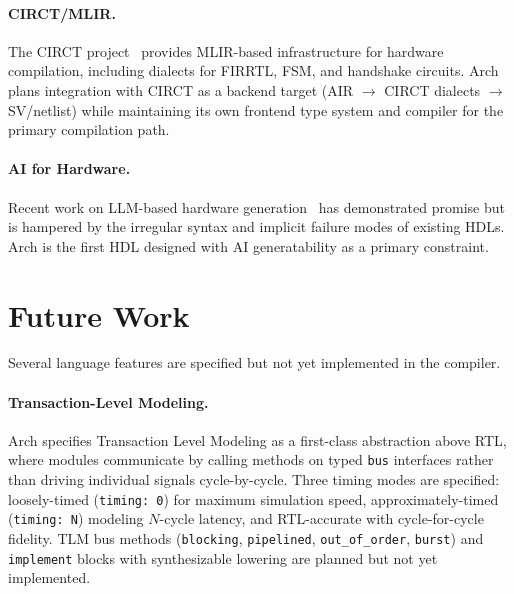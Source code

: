\documentclass[11pt,twocolumn]{article}
\begin{document}
\paragraph{CIRCT/MLIR.}
The CIRCT project~\cite{circt} provides MLIR-based infrastructure for hardware compilation, including dialects for FIRRTL, FSM, and handshake circuits. Arch plans integration with CIRCT as a backend target (AIR $\to$ CIRCT dialects $\to$ SV/netlist) while maintaining its own frontend type system and compiler for the primary compilation path.

\paragraph{AI for Hardware.}
Recent work on LLM-based hardware generation~\cite{thakur2023verigen,liu2023chipnemo,blocklove2023chip} has demonstrated promise but is hampered by the irregular syntax and implicit failure modes of existing HDLs. Arch is the first HDL designed with AI generatability as a primary constraint.

\section{Future Work}\label{sec:future}

Several language features are specified but not yet implemented in the compiler.

\paragraph{Transaction-Level Modeling.}
Arch specifies Transaction Level Modeling as a first-class abstraction above RTL, where modules communicate by calling methods on typed \texttt{bus} interfaces rather than driving individual signals cycle-by-cycle. Three timing modes are specified: loosely-timed (\texttt{timing: 0}) for maximum simulation speed, approximately-timed (\texttt{timing: N}) modeling $N$-cycle latency, and RTL-accurate with cycle-for-cycle fidelity. TLM bus methods (\texttt{blocking}, \texttt{pipelined}, \texttt{out\_of\_order}, \texttt{burst}) and \texttt{implement} blocks with synthesizable lowering are planned but not yet implemented.
\end{document}

